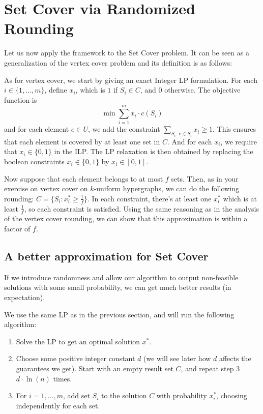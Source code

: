 \section{Set Cover via Randomized Rounding}

Let us now apply the framework to the Set Cover problem. It can be seen as a generalization of the
vertex cover problem and its definition is as follows:


As for vertex cover, we start by giving an exact Integer LP formulation. For each
$i\in\{1,\ldots,m\}$, define $x_i$, which is $1$ if $S_i\in C$, and $0$ otherwise. The objective
function is
\[
  \min\sum_{i=1}^m x_i\cdot c(S_i)
\]
and for each element $e\in U$, we add the constraint $\sum_{S_i:\,e\in S_i}x_i\ge 1$. This ensures
that each element is covered by at least one set in $C$. And for each $x_i$, we require that
$x_i\in\{0,1\}$ in the ILP. The LP relaxation is then obtained by replacing the boolean constraints
$x_i\in\{0,1\}$ by $x_i\in[0,1]$.

Now suppose that each element belongs to at most $f$ sets. Then, as in your exercise on vertex
cover on $k$-uniform hypergraphs, we can do the following rounding:
$C=\{S_i: x^*_i\ge\frac1f\}$. In each constraint, there's at least one $x^*_i$ which is at least
$\frac1f$, so each constraint is satisfied. Using the same reasoning as in the analysis of the
vertex cover rounding, we can show that this approximation is within a factor of $f$.

\subsection{A better approximation for Set Cover}

If we introduce randomness and allow our algorithm to output non-feasible solutions with some small
probability, we can get much better results (in expectation).

We use the same LP as in the previous section, and will run the following algorithm:
\begin{enumerate}
  \item Solve the LP to get an optimal solution $x^*$.
  \item Choose some positive integer constant $d$ (we will see later how $d$ affects the guarantees
    we get). Start with an empty result set $C$, and repeat step 3 $d\cdot\ln(n)$ times.
  \item For $i=1,\ldots,m$, add set $S_i$ to the solution $C$ with probability $x^*_i$, choosing
    independently for each set.
\end{enumerate}

